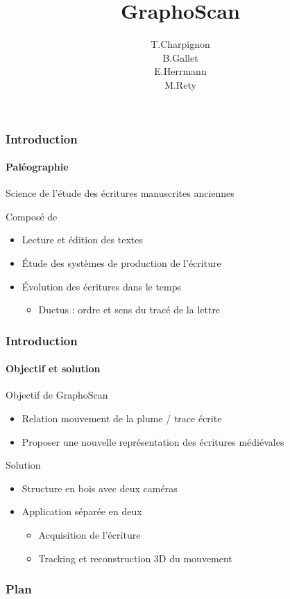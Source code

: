 \documentclass[12pt]{beamer}
\author{T.Charpignon \\ B.Gallet \\ E.Herrmann \\M.Rety\\}
\title{GraphoScan}
\institute{ Université d'Orléans \\ \medskip \textit{Encadré par : EXBRAYAT Matthieu} }
\begin{document}
\begin{frame}
\titlepage
\end{frame}


\begin{frame}
\frametitle{Introduction}
\framesubtitle{Paléographie}
\begin{definition}
Science de l'étude des écritures manuscrites anciennes
\end{definition}
\begin{block}{Composé de}
\begin{itemize}
\item Lecture et édition des textes
\item Étude des systèmes de production de l'écriture
\item Évolution des écritures dans le temps
	\begin{itemize}
	\item Ductus : ordre et sens du tracé de la lettre
	\end{itemize}
\end{itemize}
\end{block}
\end{frame}

\begin{frame}
\frametitle{Introduction}
\framesubtitle{Objectif et solution}
\begin{block}{Objectif de GraphoScan}
\begin{itemize}
\item Relation mouvement de la plume / trace écrite
\item Proposer une nouvelle représentation des écritures médiévales
\end{itemize}
\end{block}

\begin{block}{Solution}
\begin{itemize}
\item Structure en bois avec deux caméras
\item Application séparée en deux
	\begin{itemize}
	\item Acquisition de l'écriture
	\item Tracking et reconstruction 3D du mouvement
	\end{itemize}
\end{itemize}
\end{block}
\end{frame}


\begin{frame}
\frametitle{Plan}
\tableofcontents
\end{frame}
\end{document}
